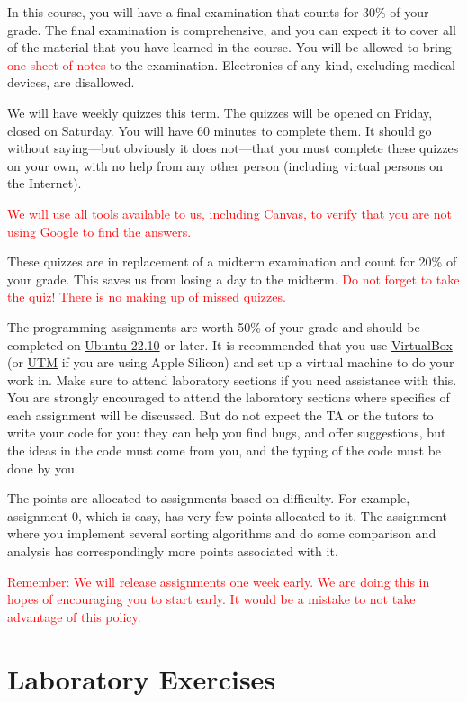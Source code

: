 \documentclass[11pt]{article}
\begin{document}
In this course, you will have a final examination that counts for 30\%
of your grade. The final examination is comprehensive, and you can
expect it to cover all of the material that you have learned in the
course. You will be allowed to bring \textcolor{red}{one sheet of notes}
to the examination. Electronics of any kind, excluding medical devices,
are disallowed.

We will have weekly quizzes this term. The quizzes will be opened on
Friday, closed on Saturday. You will have 60 minutes to complete them.
It should go without saying---but obviously it does not---that you must
complete these quizzes on your own, with no help from any other person
(including virtual persons on the Internet).

\textcolor{red}{We will use all tools available to us, including Canvas,
to verify that you are not using Google to find the answers.}

These quizzes are in replacement of a midterm examination and count for
20\% of your grade. This saves us from losing a day to the midterm.
\textcolor{red}{Do not forget to take the quiz! There is no making up of
missed quizzes.}

The programming assignments are worth 50\% of your grade and should be
completed on \href{https://ubuntu.com/download/server}{Ubuntu 22.10}
or later. It is recommended that you use
\href{https://www.virtualbox.org}{VirtualBox}
(or \href{https://mac.getutm.app}{UTM} if you are using Apple Silicon)
and set up a virtual machine to do your work in. Make sure to
attend laboratory sections if you need assistance with this. You are
strongly encouraged to attend the laboratory sections where specifics of
each assignment will be discussed. But do not expect the TA or the
tutors to write your code for you: they can help you find bugs, and
offer suggestions, but the ideas in the code must come from you, and the
typing of the code must be done by you.

The points are allocated to assignments based on difficulty. For
example, assignment 0, which is easy, has very few points allocated
to it. The assignment where you implement several sorting algorithms and
do some comparison and analysis has correspondingly more points
associated with it.

\textcolor{red}{Remember: We will release assignments one week early. We
are doing this in hopes of encouraging you to start early. It would be a
mistake to not take advantage of this policy.}

\section{Laboratory Exercises}
\end{document}

